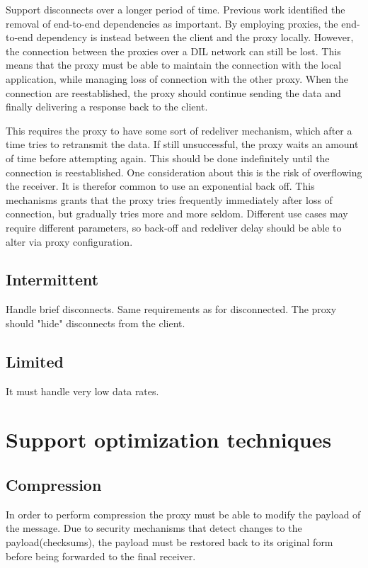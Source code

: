 Support disconnects over a longer period of time. Previous work identified the
removal of end-to-end dependencies as important. By employing proxies, the
end-to-end dependency is instead between the client and the proxy locally.
However, the connection between the proxies over a DIL network can still be
lost. This means that the proxy must be able to maintain the connection with the
local application, while managing loss of connection with the other proxy. When
the connection are reestablished, the proxy should continue sending the data and
finally delivering a response back to the client.

This requires the proxy to have some sort of redeliver mechanism, which after a
time tries to retransmit the data. If still unsuccessful, the proxy waits an
amount of time before attempting again. This should be done indefinitely until
the connection is reestablished. One consideration about this is the risk of
overflowing the receiver. It is therefor common to use an exponential back off.
This mechanisms grants that the proxy tries frequently immediately after loss of
connection, but gradually tries more and more seldom. Different use cases may
require different parameters, so back-off and redeliver delay should be able to
alter via proxy configuration.

\subsection{Intermittent}

Handle brief disconnects. Same requirements as for disconnected. The proxy
should "hide" disconnects from the client.

\subsection{Limited}

It must handle very low data rates.

\section{Support optimization techniques}

\subsection{Compression}

In order to perform compression the proxy must be able to modify the payload of
the message. Due to security mechanisms that detect changes to the
payload(checksums), the payload must be restored back to its original form
before being forwarded to the final receiver.

